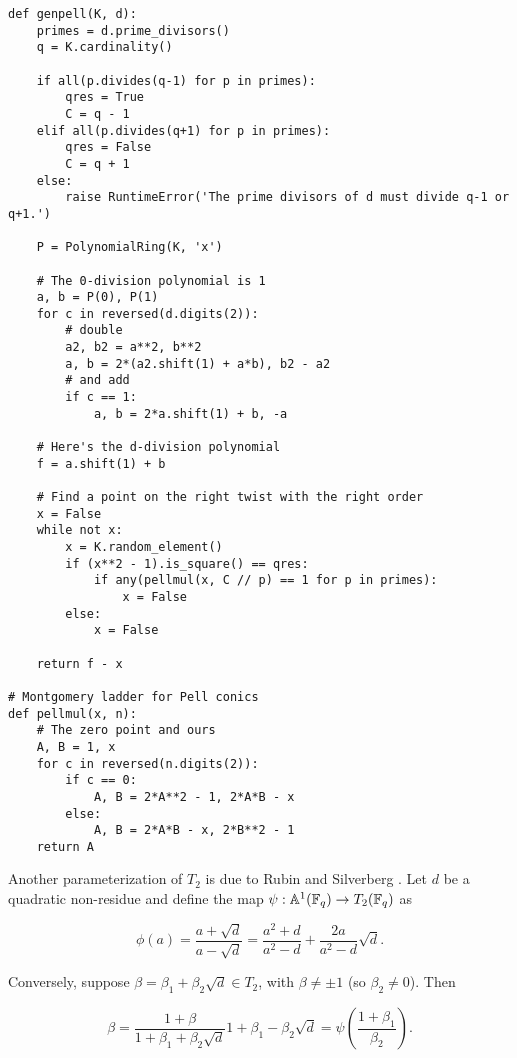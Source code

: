 \documentclass[11pt]{article}
\begin{document}
\begin{verbatim}
def genpell(K, d):
    primes = d.prime_divisors()
    q = K.cardinality()

    if all(p.divides(q-1) for p in primes):
        qres = True
        C = q - 1
    elif all(p.divides(q+1) for p in primes):
        qres = False
        C = q + 1
    else:
        raise RuntimeError('The prime divisors of d must divide q-1 or q+1.')

    P = PolynomialRing(K, 'x')

    # The 0-division polynomial is 1
    a, b = P(0), P(1)
    for c in reversed(d.digits(2)):
        # double
        a2, b2 = a**2, b**2
        a, b = 2*(a2.shift(1) + a*b), b2 - a2
        # and add
        if c == 1:
            a, b = 2*a.shift(1) + b, -a

    # Here's the d-division polynomial
    f = a.shift(1) + b

    # Find a point on the right twist with the right order
    x = False
    while not x:
        x = K.random_element()
        if (x**2 - 1).is_square() == qres:
            if any(pellmul(x, C // p) == 1 for p in primes):
                x = False
        else:
            x = False

    return f - x

# Montgomery ladder for Pell conics
def pellmul(x, n):
    # The zero point and ours
    A, B = 1, x
    for c in reversed(n.digits(2)):
        if c == 0:
            A, B = 2*A**2 - 1, 2*A*B - x
        else:
            A, B = 2*A*B - x, 2*B**2 - 1
    return A
\end{verbatim}


Another parameterization of $T_2$ is due to Rubin and Silverberg
\cite{rubin-silverberg+crypto03}. Let $d$ be a quadratic non-residue
and define the map $\psi:\mathbb{A}^1(\mathbb{F}_q) \to T_2(\mathbb{F}_q)$ as
    
\begin{equation}
  \phi(a) = \frac{a+\sqrt{d}}{a-\sqrt{d}} = \frac{a^2+d}{a^2-d} + \frac{2a}{a^2-d}\sqrt{d}.
\end{equation}
    
Conversely, suppose $\beta = \beta_1+\beta_2\sqrt{d}\in T_2$, with
$\beta\ne\pm 1$ (so $\beta_2\ne 0$). Then

\begin{equation}
  \beta = \frac{1+\beta}{1+\beta_1+\beta_2\sqrt{d}}{1+\beta_1-\beta_2\sqrt{d}}
  =\psi\left(\frac{1+\beta_1}{\beta_2}\right).
\end{equation}
    
\end{document}
